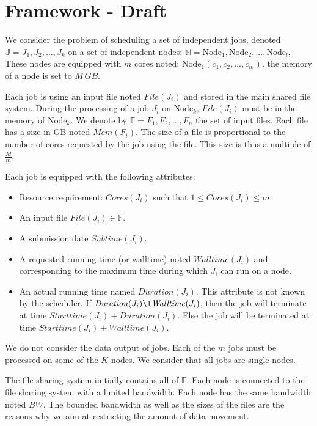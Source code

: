 \documentclass[conference,10pt]{IEEEtran}
\newcommand{\Node}[1]{\ensuremath{\mathrm{Node}_{#1}}\xspace}
\newcommand{\file}{\ensuremath{\mathit{File}}\xspace}
\newcommand{\memory}{\ensuremath{\mathit{Mem}}\xspace}
\newcommand{\duration}{\mathit{Duration}\xspace}
\newcommand{\bandwidth}{\mathit{BW}\xspace}
\newcommand{\core}{\mathit{Cores}\xspace}
\newcommand{\submissiontime}{\mathit{Subtime}\xspace}
\newcommand{\walltime}{\mathit{Walltime}\xspace}
\newcommand{\start}{\mathit{Starttime}\xspace}
\newcommand{\fileset}{\ensuremath{\mathbb{F}}\xspace}
\newcommand{\jobset}{\ensuremath{\mathbb{J}}\xspace}
\newcommand{\nodeset}{\ensuremath{\mathbb{N}}\xspace}
\begin{document}
\section{Framework - Draft}\label{sec.framework}

We consider the problem of scheduling a set of independent jobs,
denoted $\jobset = {J_1, J_2, ..., J_k}$ on a set of independent nodes:
$\nodeset = {\Node{1}, \Node{2}, ..., \Node{l}}$.
These nodes are equipped with $m$ cores noted: $\Node{1}(c_1, c_2, ..., c_m)$.
the memory of a node is set to $M\,GB$.

Each job is using an input file noted $\file(J_i)$ and
stored in the main shared file system.
During the processing of a job $J_i$ on $\Node{k}$,
$\file(J_i)$ must be in the memory of $\Node{k}$. 
We denote by $\fileset = F_1, F_2, ..., F_n$ the set of input files.
Each file has a size in GB noted $\memory(F_i)$.
The size of a file is proportional to the number of cores requested by the job using the file.
This size is thus a multiple of $\frac{M}{m}$.

Each job is equipped with the following attributes:
\begin{itemize}
	\item Resource requirement: $\core(J_i)$ such that $1 \leq \core(J_i) \leq m$.
	\item An input file $\file(J_i) \in \fileset$.
	\item A submission date $\submissiontime(J_i)$.
	\item A requested running time (or walltime) noted $\walltime(J_i)$ and corresponding to
	the maximum time during which $J_i$ can run on a node.
	\item An actual running time named $\duration(J_i)$. This attribute is not known by
	the scheduler. If $\duration(J_i) \l \walltime(J_i)$, then the job will terminate at
	time $\start(J_i) + \duration(J_i)$. 
	Else the job will be terminated at time $\start(J_i) + \walltime(J_i)$.
\end{itemize}

We do not consider the data output of jobs.
Each of the $m$ jobs must be processed on some of the $K$ nodes. 
We consider that all jobs are single nodes.

The file sharing system initially contains all of $\fileset$.
Each node is connected to the file sharing system with a limited bandwidth.
Each node has the same bandwidth noted $\bandwidth$.
The bounded bandwidth as well as the sizes of the files are the reasons why
we aim at restricting the amount of data movement.
\end{document}
